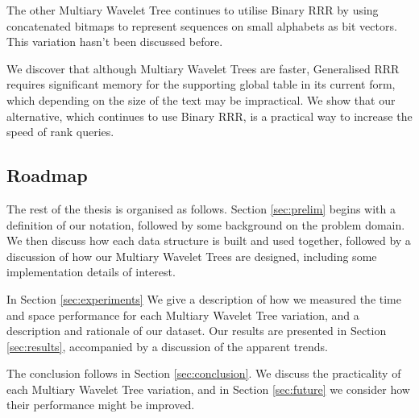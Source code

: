 The other Multiary Wavelet Tree continues to utilise Binary RRR by using 
concatenated bitmaps to represent sequences on small alphabets as bit vectors.
This variation hasn't been discussed before.

We discover that although Multiary Wavelet Trees are faster, Generalised RRR 
requires significant memory for the supporting global table in its current form, 
which depending on the size of the text may be impractical. We show that our 
alternative, which continues to use Binary RRR, is a practical way to increase 
the speed of rank queries.


\subsection{Roadmap}

The rest of the thesis is organised as follows. Section \ref{sec:prelim} begins 
with a definition of our notation, followed by some background on the problem 
domain. We then discuss how each data structure is built and used together, 
followed by a discussion of how our Multiary Wavelet Trees are designed, 
including some implementation details of interest.

In Section \ref{sec:experiments} We give a description of how we measured the 
time and space performance for each Multiary Wavelet Tree variation,
and a description and rationale of our dataset. Our results are presented in 
Section \ref{sec:results}, accompanied by a discussion of the apparent trends.

The conclusion follows in Section \ref{sec:conclusion}. We discuss the 
practicality of each Multiary Wavelet Tree variation, and in Section \ref{sec:future} we 
consider how their performance might be improved.

